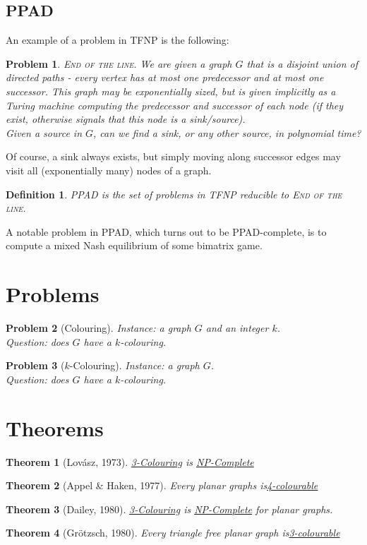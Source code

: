 \documentclass[]{article}
\theoremstyle{break}
\theoremstyle{break}
\newtheorem{definition}{Definition}[section]
\newtheorem{problem}{Problem}[section]
\newtheorem{theorem}{Theorem}[section]
\begin{document}
\subsection{PPAD}
An example of a problem in TFNP is the following:
\begin{problem}
	\textsc{End of the line.} We are given a graph $G$ that is a disjoint union of directed paths - every vertex has at most one predecessor and at most one successor. This graph may be exponentially sized,
	but is given implicitly as a Turing machine computing the predecessor and successor of each node (if they exist, otherwise signals that this node is a sink/source).\\
	Given a source in $G$, can we find a sink, or any other source, in polynomial time?
\end{problem}

Of course, a sink always exists, but simply moving along successor edges may visit all (exponentially many) nodes of a graph.

\begin{definition}
	PPAD is the set of problems in TFNP reducible to \textsc{End of the line.}
\end{definition}

A notable problem in PPAD, which turns out to be PPAD-complete, is to compute a mixed Nash equilibrium of some bimatrix game.
\section{Problems}
\label{prob:colouring}
\begin{problem}[Colouring]
	\textit{Instance}: a graph $G$ and an integer $k$.
	\\
	\textit{Question}: does $G$ have a $k$-colouring.
\end{problem}
\label{prob:kcolouring}
\begin{problem}[$k$-Colouring]
	\textit{Instance}: a graph $G$.
	\\
	\textit{Question}: does $G$ have a $k$-colouring.
\end{problem}
\section{Theorems}
\begin{theorem}[Lov\'asz, 1973]
	\hyperref[prob:kcolouring]{3-Colouring} is \hyperref[sec:NP]{NP-Complete}
\end{theorem}
\begin{theorem}[Appel \& Haken, 1977]
	Every planar graphs is\hyperref[prob:kcolouring]{4-colourable} 
\end{theorem}
\begin{theorem}[Dailey, 1980]
	\hyperref[prob:kcolouring]{3-Colouring} is \hyperref[sec:NP]{NP-Complete} for planar graphs.
\end{theorem}
\begin{theorem}[Gr\"otzsch, 1980]
	Every triangle free planar graph is\hyperref[prob:kcolouring]{3-colourable} 
\end{theorem}
\end{document}
